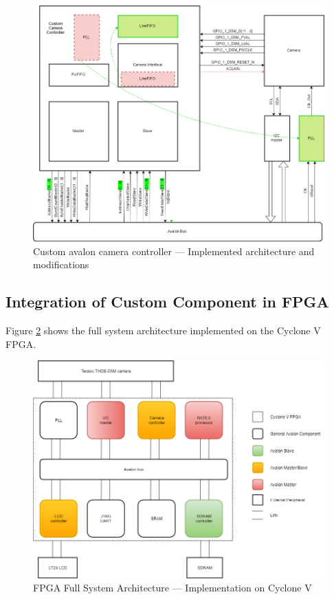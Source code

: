 \documentclass{article}
\begin{document}
\begin{figure}[H]
\centering
\includegraphics[scale=0.4]{images/CameraComponent.png}
\caption{Custom avalon camera controller --- Implemented architecture and modifications}
\label{fig:CameraComponent}
\end{figure}

\subsection{Integration of Custom Component in FPGA}

Figure \ref{fig:FpgaSystem} shows the full system architecture implemented on the Cyclone V FPGA.

\begin{figure}[H]
\centering
\includegraphics[scale=0.45]{images/FpgaSystem.png}
\caption{FPGA Full System Architecture --- Implementation on Cyclone V}
\label{fig:FpgaSystem}
\end{figure}
\end{document}

